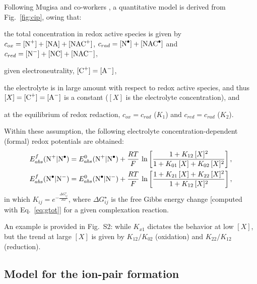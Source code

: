 \documentclass[review]{elsarticle}
\begin{document}
Following Mugisa and co-workers \cite{mugisaEffectIonparingKinetics2024}, a quantitative model is derived from Fig.~\ref{fig:cip}, owing that:  \begin{inparaenum}[(i)]
	\item the total concentration in redox active species is given by $c_{ox} = [\ce{N+}]+[\ce{NA}] + [\ce{NAC+}]$, $c_{rad} = [\ce{N^.}] + [\ce{NAC^.}]$ and $c_{red} =  [\ce{N-}]+[\ce{NC}] + [\ce{NAC-}]$, 
	\item given electroneutrality, $ [\ce{C+}] = [\ce{A-}] $,
	\item the electrolyte is in large amount with respect to redox active species, and thus $[X] = [\ce{C+}] = [\ce{A-}] $ is a constant ($[X]$ is the electrolyte concentration), and
	\item at the equilibrium of redox redaction, $c_{ox} = c_{rad}$ ($K_1$) and $c_{red} = c_{rad}$ ($K_2$).
\end{inparaenum}
Within these assumption, the following electrolyte concentration-dependent (formal) redox potentials are obtained:\begin{align}
	E^f_{abs}(\ce{N+|N^.}) &= E^0_ {abs}(\ce{N+|N^.})+\frac{RT}{F}\,\ln\left[\frac{1+K_{12}\,[X]^2}{1+K_{01}\,[X]+K_{02}\,[X]^2}\right],\\
	E^f_{abs}(\ce{N^.|N-}) &= E^0_ {abs}(\ce{N^.|N-})+\frac{RT}{F}\,\ln\left[\frac{1+K_{21}\,[X]+K_{22}\,[X]^2}{1+K_{12}\,[X]^2}\right],
\end{align}
in which $K_{ij}= e^{-\frac{\Delta G_{ij}^\star}{RT}}$, where $\Delta G_{ij}^\star$ is the free Gibbs energy change [computed with Eq.~\eqref{eq:gtot}] for a given complexation reaction.

An example is provided in Fig.~S2: while $K_{x1}$ dictates the behavior at low $[X]$, but the trend at large $[X]$ is given by $K_{12} / K_{02}$ (oxidation) and $K_{22} / K_{12}$ (reduction).

\subsection{Model for the ion-pair formation}
\end{document}
